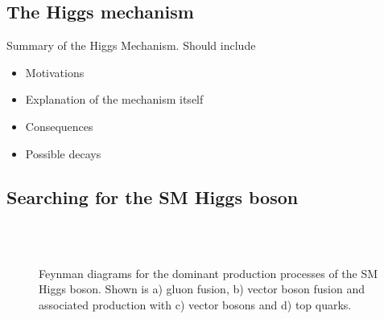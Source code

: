 \subsection{The Higgs mechanism}

Summary of the Higgs Mechanism. Should include
\begin{itemize}
 \item Motivations 
 \item Explanation of the mechanism itself
 \item Consequences 
 \item Possible decays
\end{itemize}

\subsection{Searching for the SM Higgs boson}


\begin{figure}[htbp]
 \qquad
{} \\
  \qquad
{} \\
\caption[Feynman diagrams for the dominant production processes of the SM Higgs
boson.]{Feynman diagrams for the dominant production processes of the SM Higgs
boson. Shown is a) gluon fusion, b) vector boson fusion and
associated production with c) vector bosons and d) top quarks.}
\label{fig:SMFeynmanDiagrams}
\end{figure}

